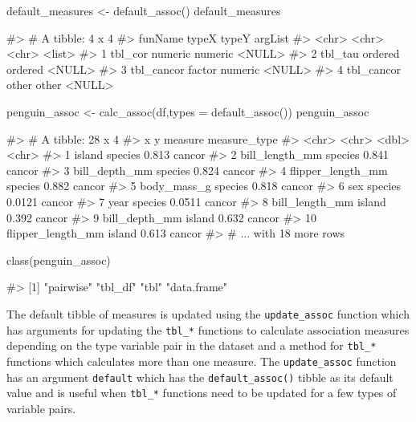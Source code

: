 \begin{Schunk}
\begin{Sinput}
default_measures <- default_assoc()
default_measures
\end{Sinput}
\begin{Soutput}
#> # A tibble: 4 x 4
#>   funName    typeX   typeY   argList
#>   <chr>      <chr>   <chr>   <list> 
#> 1 tbl_cor    numeric numeric <NULL> 
#> 2 tbl_tau    ordered ordered <NULL> 
#> 3 tbl_cancor factor  numeric <NULL> 
#> 4 tbl_cancor other   other   <NULL>
\end{Soutput}
\begin{Sinput}
penguin_assoc <- calc_assoc(df,types = default_assoc())
penguin_assoc
\end{Sinput}
\begin{Soutput}
#> # A tibble: 28 x 4
#>    x                 y       measure measure_type
#>    <chr>             <chr>     <dbl> <chr>       
#>  1 island            species  0.813  cancor      
#>  2 bill_length_mm    species  0.841  cancor      
#>  3 bill_depth_mm     species  0.824  cancor      
#>  4 flipper_length_mm species  0.882  cancor      
#>  5 body_mass_g       species  0.818  cancor      
#>  6 sex               species  0.0121 cancor      
#>  7 year              species  0.0511 cancor      
#>  8 bill_length_mm    island   0.392  cancor      
#>  9 bill_depth_mm     island   0.632  cancor      
#> 10 flipper_length_mm island   0.613  cancor      
#> # ... with 18 more rows
\end{Soutput}
\begin{Sinput}
class(penguin_assoc)
\end{Sinput}
\begin{Soutput}
#> [1] "pairwise"   "tbl_df"     "tbl"        "data.frame"
\end{Soutput}
\end{Schunk}

The default tibble of measures is updated using the
\texttt{update\_assoc} function which has arguments for updating the
\texttt{tbl\_*} functions to calculate association measures depending on
the type variable pair in the dataset and a method for \texttt{tbl\_*}
functions which calculates more than one measure. The
\texttt{update\_assoc} function has an argument \texttt{default} which
has the \texttt{default\_assoc()} tibble as its default value and is
useful when \texttt{tbl\_*} functions need to be updated for a few types
of variable pairs.

